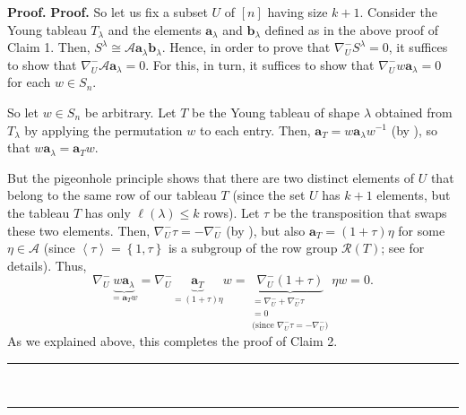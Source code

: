 \documentclass[numbers=enddot,12pt,final,onecolumn,notitlepage]{scrartcl}%
\numberwithin{exer}{subsection}
\theoremstyle{definition}
\newenvironment{proof}[1][Proof]{\noindent\textbf{#1.} }{\ \rule{0.5em}{0.5em}}
\begin{document}
\begin{proof}
\begin{proof}
So let us fix a subset $U$ of $\left[  n\right]  $ having size $k+1$. Consider
the Young tableau $T_{\lambda}$ and the elements $\mathbf{a}_{\lambda}$ and
$\mathbf{b}_{\lambda}$ defined as in the above proof of Claim 1. Then,
$S^{\lambda}\cong\mathcal{A}\mathbf{a}_{\lambda}\mathbf{b}_{\lambda}$. Hence,
in order to prove that $\nabla_{U}^{-}S^{\lambda}=0$, it suffices to show that
$\nabla_{U}^{-}\mathcal{A}\mathbf{a}_{\lambda}=0$. For this, in turn, it
suffices to show that $\nabla_{U}^{-}w\mathbf{a}_{\lambda}=0$ for each $w\in
S_{n}$.

So let $w\in S_{n}$ be arbitrary. Let $T$ be the Young tableau of shape
$\lambda$ obtained from $T_{\lambda}$ by applying the permutation $w$ to each
entry. Then, $\mathbf{a}_{T}=w\mathbf{a}_{\lambda}w^{-1}$ (by
\cite[Proposition 5.5.11]{sga}), so that $w\mathbf{a}_{\lambda}=\mathbf{a}%
_{T}w$.

But the pigeonhole principle shows that there are two distinct elements of $U$
that belong to the same row of our tableau $T$ (since the set $U$ has $k+1$
elements, but the tableau $T$ has only $\ell\left(  \lambda\right)  \leq k$
rows). Let $\tau$ be the transposition that swaps these two elements. Then,
$\nabla_{U}^{-}\tau=-\nabla_{U}^{-}$ (by \cite[Proposition 3.7.4 \textbf{(c)}%
]{sga}), but also $\mathbf{a}_{T}=\left(  1+\tau\right)  \eta$ for some
$\eta\in\mathcal{A}$ (since $\left\langle \tau\right\rangle =\left\{
1,\tau\right\}  $ is a subgroup of the row group $\mathcal{R}\left(  T\right)
$; see \cite[Proposition 5.5.8 \textbf{(b)}]{sga} for details). Thus,%
\[
\nabla_{U}^{-}\underbrace{w\mathbf{a}_{\lambda}}_{=\mathbf{a}_{T}w}=\nabla
_{U}^{-}\underbrace{\mathbf{a}_{T}}_{=\left(  1+\tau\right)  \eta
}w=\underbrace{\nabla_{U}^{-}\left(  1+\tau\right)  }_{\substack{=\nabla
_{U}^{-}+\nabla_{U}^{-}\tau\\=0\\\text{(since }\nabla_{U}^{-}\tau=-\nabla
_{U}^{-}\text{)}}}\eta w=0.
\]
As we explained above, this completes the proof of Claim 2.
\end{proof}


\end{proof}
\end{document}
